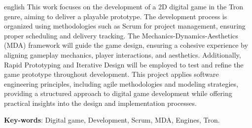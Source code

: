 \begin{resumo}[Abstract]
  \begin{otherlanguage*}{english}
    This work focuses on the development of a 2D digital game in the Tron genre, aiming to deliver a playable prototype. The development process is organized using methodologies such as Scrum for project management, ensuring proper scheduling and delivery tracking. The Mechanics-Dynamics-Aesthetics (MDA) framework will guide the game design, ensuring a cohesive experience by aligning gameplay mechanics, player interactions, and aesthetics. Additionally, Rapid Prototyping and Iterative Design will be employed to test and refine the game prototype throughout development. This project applies software engineering principles, including agile methodologies and modeling strategies, providing a structured approach to digital game development while offering practical insights into the design and implementation processes.

    \vspace{\onelineskip}

    \noindent
    \textbf{Key-words}: Digital game, Development, Scrum, MDA, Engines, Tron.
  \end{otherlanguage*}
\end{resumo}

